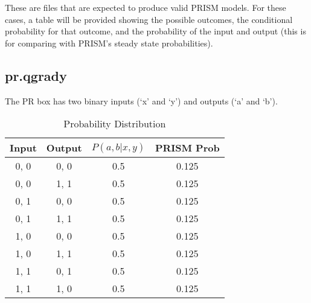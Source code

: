\documentclass[report.tex]{subfiles}
\begin{document}
These are files that are expected to produce valid PRISM models. For these
cases, a table will be provided showing the possible outcomes, the conditional
probability for that outcome, and the probability of the input and output (this
is for comparing with PRISM's steady state probabilities).

\subsection{pr.qgrady} %
\label{sub:pr_qgrady}
The PR box has two binary inputs (`x' and `y') and outputs (`a' and `b').
\begin{table}[H]
  \centering
  \begin{tabular}{c | c | c | c}
    Input & Output & \(P(a, b | x, y)\) & PRISM Prob \\
    \hline
    0, 0 & 0, 0 & 0.5 & 0.125 \\
    0, 0 & 1, 1 & 0.5 & 0.125 \\
    0, 1 & 0, 0 & 0.5 & 0.125 \\
    0, 1 & 1, 1 & 0.5 & 0.125 \\
    1, 0 & 0, 0 & 0.5 & 0.125 \\
    1, 0 & 1, 1 & 0.5 & 0.125 \\
    1, 1 & 0, 1 & 0.5 & 0.125 \\
    1, 1 & 1, 0 & 0.5 & 0.125 \\
  \end{tabular}
  \caption{Probability Distribution}
  \label{tab:pr_qgrady}
\end{table}
\end{document}
